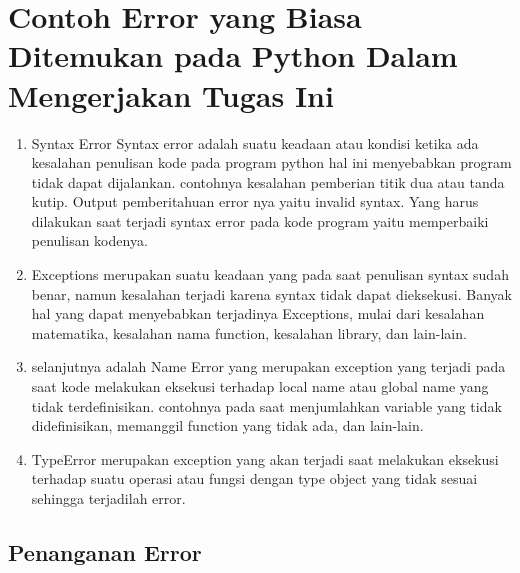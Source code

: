 \documentclass{article}
\begin{document}
\section{Contoh Error yang Biasa Ditemukan pada Python Dalam Mengerjakan Tugas Ini}
\begin{enumerate}
    \item  Syntax Error Syntax error adalah suatu keadaan atau kondisi ketika ada kesalahan penulisan kode pada program python hal ini menyebabkan program tidak
    dapat dijalankan. contohnya kesalahan pemberian titik dua atau tanda kutip.
    Output pemberitahuan error nya yaitu invalid syntax. Yang harus dilakukan
    saat terjadi syntax error pada kode program yaitu memperbaiki penulisan kodenya.
    \item Exceptions merupakan suatu keadaan yang pada saat penulisan syntax sudah benar, namun kesalahan terjadi karena syntax tidak dapat dieksekusi. Banyak hal yang dapat menyebabkan terjadinya Exceptions, mulai dari kesalahan matematika, kesalahan nama function, kesalahan library, dan lain-lain.
    \item selanjutnya adalah Name Error yang merupakan exception yang terjadi pada saat kode melakukan eksekusi terhadap local name atau global name yang tidak terdefinisikan. contohnya pada saat menjumlahkan variable yang tidak didefinisikan, memanggil function yang tidak ada, dan lain-lain.
    \item TypeError merupakan exception yang akan terjadi saat melakukan eksekusi terhadap suatu operasi atau fungsi dengan type object yang tidak sesuai sehingga terjadilah error.
\end{enumerate}
\subsection{Penanganan Error}
\usepackage{
Berikut adalah salah satu contoh kode untuk menangani error:\\
keep_asking = True\\
while keep_asking:\\
    x = int(input("Enter a number: "))\\
    print("Dividing 50 by", x,"will give you :", 50/x)\\}
\end{document}
